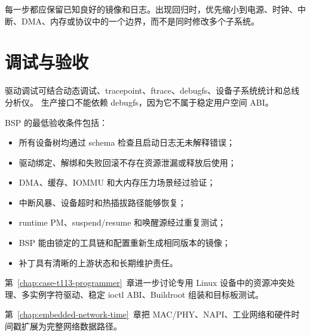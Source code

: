 每一步都应保留已知良好的镜像和日志。出现回归时，优先缩小到电源、时钟、中断、DMA、内存或协议中的一个边界，而不是同时修改多个子系统。

\section{调试与验收}

驱动调试可结合动态调试、tracepoint、ftrace、debugfs、设备子系统统计和总线分析仪。
生产接口不能依赖 debugfs，因为它不属于稳定用户空间 ABI。

BSP 的最低验收条件包括：
\begin{itemize}
  \item 所有设备树均通过 schema 检查且启动日志无未解释错误；
  \item 驱动绑定、解绑和失败回滚不存在资源泄漏或释放后使用；
  \item DMA、缓存、IOMMU 和大内存压力场景经过验证；
  \item 中断风暴、设备超时和热插拔路径能够恢复；
  \item runtime PM、suspend/resume 和唤醒源经过重复测试；
  \item BSP 能由锁定的工具链和配置重新生成相同版本的镜像；
  \item 补丁具有清晰的上游状态和长期维护责任。
\end{itemize}

第~\ref{chap:case-t113-programmer}~章进一步讨论专用 Linux 设备中的资源冲突处理、多实例字符驱动、稳定 ioctl ABI、Buildroot 组装和目标板测试。

第~\ref{chap:embedded-network-time}~章把 MAC/PHY、NAPI、工业网络和硬件时间戳扩展为完整网络数据路径。
